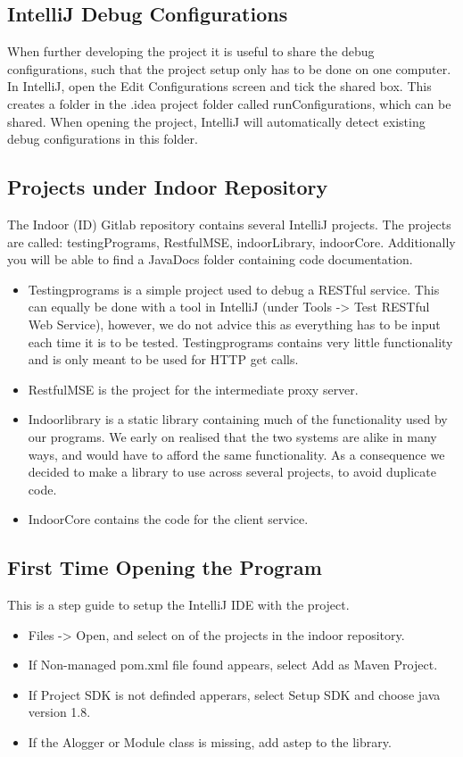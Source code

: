 \subsection*{IntelliJ Debug Configurations}
When further developing the project it is useful to share the debug configurations, such that the project setup only has to be done on one computer. In IntelliJ, open the Edit Configurations screen and tick the shared box. This creates a folder in the .idea project folder called runConfigurations, which can be shared. When opening the project, IntelliJ will automatically detect existing debug configurations in this folder.

\subsection*{Projects under Indoor Repository}
The Indoor (ID) Gitlab repository contains several IntelliJ projects. The projects are called: testingPrograms, RestfulMSE, indoorLibrary, indoorCore. Additionally you will be able to find a JavaDocs folder containing code documentation.

\begin{itemize}
\item Testingprograms is a simple project used to debug a RESTful service. This can equally be done with a tool in IntelliJ (under Tools -> Test RESTful Web Service), however, we do not advice this as everything has to be input each time it is to be tested. Testingprograms contains very little functionality and is only meant to be used for HTTP get calls.
\item RestfulMSE is the project for the intermediate proxy server. 
\item Indoorlibrary is a static library containing much of the functionality used by our programs. We early on realised that the two systems are alike in many ways, and would have to afford the same functionality. As a consequence we decided to make a library to use across several projects, to avoid duplicate code. 
\item IndoorCore contains the code for the client service. 
\end{itemize} 

\subsection*{First Time Opening the Program}
This is a step guide to setup the IntelliJ IDE with the project.
\begin{itemize}
\item Files -> Open, and select on of the projects in the indoor repository.
\item If Non-managed pom.xml file found appears, select Add as Maven Project.
\item If Project SDK is not definded apperars, select Setup SDK and choose java version 1.8.
\item If the Alogger or Module class is missing, add astep to the library.
\end{itemize}
